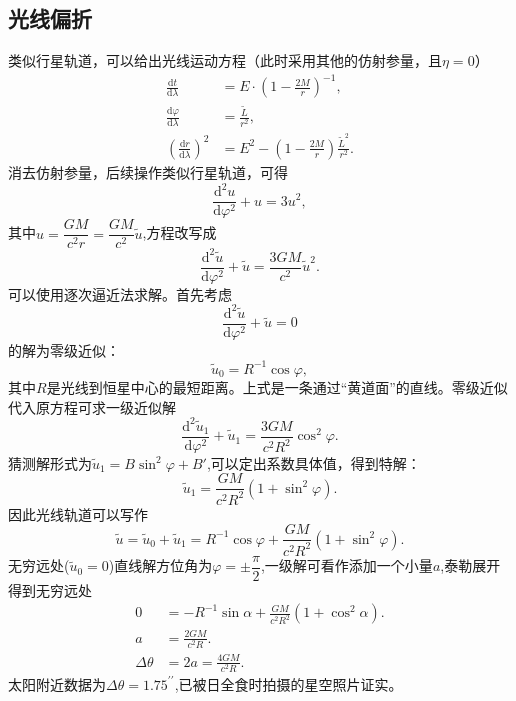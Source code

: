 \documentclass[11pt, a4paper, oneside, onecolumn]{ctexart}
\numberwithin{equation}{subsection}
\begin{document}
\subsection{光线偏折}
类似行星轨道，可以给出光线运动方程（此时采用其他的仿射参量，且$\eta=0$）
\begin{align}
\frac{\mathrm{d}t}{\mathrm{d}\lambda}&=E\cdot\left(1-\frac{2M}{r}\right)^{-1},\\
\frac{\mathrm{d}\varphi}{\mathrm{d}\lambda}&=\frac{\widetilde{L}}{r^{2}},\\
\left(\frac{\mathrm{d}r}{\mathrm{d}\lambda}\right)^{2}&=E^{2}-\left(1-\frac{2M}{r}\right)\frac{\widetilde{L}^{2}}{r^{2}}.
\end{align}
消去仿射参量，后续操作类似行星轨道，可得
\begin{equation}
\frac{\mathrm{d}^{2}u}{\mathrm{d}\varphi^{2}}+u=3u^{2},
\end{equation}
其中$u=\dfrac{GM}{c^{2}r}=\dfrac{GM}{c^{2}}\widetilde{u}$,方程改写成
\begin{equation}
\frac{\mathrm{d}^{2}\widetilde{u}}{\mathrm{d}\varphi^{2}}+\widetilde{u}=\frac{3GM}{c^{2}}\widetilde{u}^{2}.
\end{equation}
可以使用逐次逼近法求解。首先考虑
\begin{equation}
\frac{\mathrm{d}^{2}\widetilde{u}}{\mathrm{d}\varphi^{2}}+\widetilde{u}=0
\end{equation}
的解为零级近似：
\begin{equation}
\widetilde{u}_{0}=R^{-1}\cos\varphi,
\end{equation}
其中$R$是光线到恒星中心的最短距离。上式是一条通过“黄道面”的直线。零级近似代入原方程可求一级近似解
\begin{equation}
\frac{\mathrm{d}^{2}\widetilde{u}_{1}}{\mathrm{d}\varphi^{2}}+\widetilde{u}_{1}=\frac{3GM}{c^{2}R^{2}}\cos^{2}\varphi.
\end{equation}
猜测解形式为$\widetilde{u}_{1}=B\sin^{2}\varphi+B'$,可以定出系数具体值，得到特解：
\begin{equation}
\widetilde{u}_{1}=\frac{GM}{c^{2}R^{2}}\left(1+\sin^{2}\varphi\right).
\end{equation}
因此光线轨道可以写作
\begin{equation}
\widetilde{u}=\widetilde{u}_{0}+\widetilde{u}_{1}=R^{-1}\cos\varphi+\frac{GM}{c^{2}R^{2}}\left(1+\sin^{2}\varphi\right).
\end{equation}
无穷远处($\widetilde{u}_{0}=0$)直线解方位角为$\varphi=\pm\dfrac{\pi}{2}$,一级解可看作添加一个小量$a$,泰勒展开得到无穷远处
\begin{align}
0&=-R^{-1}\sin\alpha+\frac{GM}{c^{2}R^{2}}\left(1+\cos^{2}\alpha\right).\\
a&=\frac{2GM}{c^{2}R}.\\
\Delta{}\theta&=2a=\frac{4GM}{c^{2}R}.
\end{align}
太阳附近数据为$\Delta{}\theta=1.75^{\prime\prime}$,已被日全食时拍摄的星空照片证实。

\printbibliography
\end{document}
